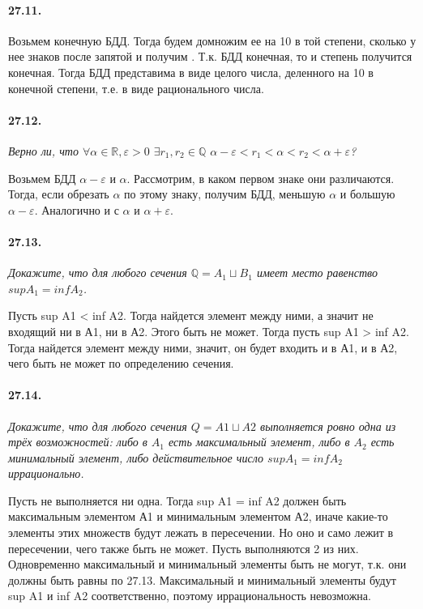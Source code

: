 \documentclass{book}
\begin{document}
\paragraph{27.11.}
Возьмем конечную БДД. Тогда будем домножим ее на 10 в той степени, сколько у нее знаков после запятой и получим . Т.к. БДД конечная, то и степень получится конечная. Тогда БДД представима в виде целого числа, деленного на 10 в конечной степени, т.е. в виде рационального числа.

\paragraph{27.12.}
\textit{Верно ли, что $\forall \alpha \in \mathbb{R}, \varepsilon > 0$ $\exists r_1, r_2 \in \mathbb{Q}$ $\alpha - \varepsilon < r_1 < \alpha < r_2 < \alpha + \varepsilon$?} 

Возьмем БДД $\alpha - \varepsilon$ и $\alpha$. Рассмотрим, в каком первом знаке они различаются. Тогда, если обрезать $\alpha$ по этому знаку, получим БДД, меньшую $\alpha$ и большую $\alpha - \varepsilon$. Аналогично и с $\alpha$ и $\alpha + \varepsilon$.

\paragraph{27.13.}
\textit{Докажите, что для любого сечения $\mathbb{Q} = A_1 \sqcup B_1$ имеет место равенство $sup A_1 = inf A_2$.}

Пусть sup A1 < inf A2. Тогда найдется элемент между ними, а значит не входящий ни в А1, ни в А2. Этого быть не может. Тогда пусть sup A1 > inf A2. Тогда найдется элемент между ними, значит, он будет входить и в А1, и в А2, чего быть не может по определению сечения.

\paragraph{27.14.}
\textit{Докажите, что для любого сечения $Q = A1 \sqcup A2$ выполняется ровно одна из трёх возможностей: либо в $A_1$ есть максимальный элемент, либо в $A_2$ есть минимальный
элемент, либо действительное число $sup A_1 = inf A_2$ иррационально.}

Пусть не выполняется ни одна. Тогда sup A1 = inf A2 должен быть максимальным элементом А1 и минимальным элементом А2, иначе какие-то элементы этих множеств будут лежать в пересечении. Но оно и само лежит в пересечении, чего также быть не может.
Пусть выполняются 2 из них. Одновременно максимальный и минимальный элементы быть не могут, т.к. они должны быть равны по 27.13. Максимальный и минимальный элементы будут sup A1 и inf A2 соответственно, поэтому иррациональность невозможна. 
\newpage
\end{document}
